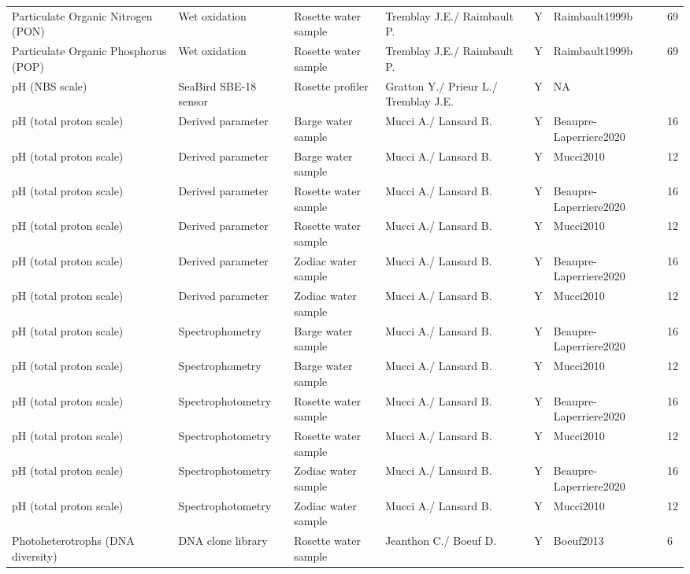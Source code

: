\begin{ThreePartTable}
\begin{longtable}[t]{lllllll}
\addlinespace
Particulate Organic Nitrogen (PON) & Wet oxidation & Rosette water sample & Tremblay J.E./ Raimbault P. & Y & Raimbault1999b & 69\\
Particulate Organic Phosphorus (POP) & Wet oxidation & Rosette water sample & Tremblay J.E./ Raimbault P. & Y & Raimbault1999b & 69\\
pH (NBS scale) & SeaBird SBE-18 sensor & Rosette profiler & Gratton Y./ Prieur L./ Tremblay J.E. & Y & NA & \\
pH (total proton scale) & Derived parameter & Barge water sample & Mucci A./ Lansard B. & Y & Beaupre-Laperriere2020 & 16\\
pH (total proton scale) & Derived parameter & Barge water sample & Mucci A./ Lansard B. & Y & Mucci2010 & 12\\
\addlinespace
pH (total proton scale) & Derived parameter & Rosette water sample & Mucci A./ Lansard B. & Y & Beaupre-Laperriere2020 & 16\\
pH (total proton scale) & Derived parameter & Rosette water sample & Mucci A./ Lansard B. & Y & Mucci2010 & 12\\
pH (total proton scale) & Derived parameter & Zodiac water sample & Mucci A./ Lansard B. & Y & Beaupre-Laperriere2020 & 16\\
pH (total proton scale) & Derived parameter & Zodiac water sample & Mucci A./ Lansard B. & Y & Mucci2010 & 12\\
pH (total proton scale) & Spectrophometry & Barge water sample & Mucci A./ Lansard B. & Y & Beaupre-Laperriere2020 & 16\\
\addlinespace
pH (total proton scale) & Spectrophometry & Barge water sample & Mucci A./ Lansard B. & Y & Mucci2010 & 12\\
pH (total proton scale) & Spectrophotometry & Rosette water sample & Mucci A./ Lansard B. & Y & Beaupre-Laperriere2020 & 16\\
pH (total proton scale) & Spectrophotometry & Rosette water sample & Mucci A./ Lansard B. & Y & Mucci2010 & 12\\
pH (total proton scale) & Spectrophotometry & Zodiac water sample & Mucci A./ Lansard B. & Y & Beaupre-Laperriere2020 & 16\\
pH (total proton scale) & Spectrophotometry & Zodiac water sample & Mucci A./ Lansard B. & Y & Mucci2010 & 12\\
\addlinespace
Photoheterotrophs (DNA diversity) & DNA clone library & Rosette water sample & Jeanthon C./ Boeuf D. & Y & Boeuf2013 & 6\\

\end{longtable}
\end{ThreePartTable}

